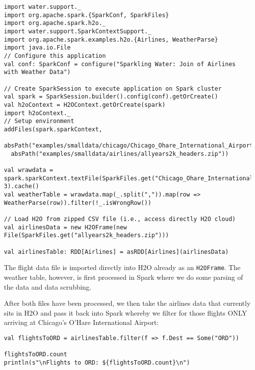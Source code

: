 \begin{lstlisting}[style=Scala]
import water.support._
import org.apache.spark.{SparkConf, SparkFiles}
import org.apache.spark.h2o._
import water.support.SparkContextSupport._
import org.apache.spark.examples.h2o.{Airlines, WeatherParse}
import java.io.File
// Configure this application
val conf: SparkConf = configure("Sparkling Water: Join of Airlines with Weather Data")

// Create SparkSession to execute application on Spark cluster
val spark = SparkSession.builder().config(conf).getOrCreate()
val h2oContext = H2OContext.getOrCreate(spark)
import h2oContext._
// Setup environment
addFiles(spark.sparkContext,
  absPath("examples/smalldata/chicago/Chicago_Ohare_International_Airport.csv"),
  absPath("examples/smalldata/airlines/allyears2k_headers.zip"))

val wrawdata = spark.sparkContext.textFile(SparkFiles.get("Chicago_Ohare_International_Airport.csv"), 3).cache()
val weatherTable = wrawdata.map(_.split(",")).map(row => WeatherParse(row)).filter(!_.isWrongRow())

// Load H2O from zipped CSV file (i.e., access directly H2O cloud)
val airlinesData = new H2OFrame(new File(SparkFiles.get("allyears2k_headers.zip")))

val airlinesTable: RDD[Airlines] = asRDD[Airlines](airlinesData)
\end{lstlisting}

The flight data file is imported directly into H2O already as an \texttt{H2OFrame}. The weather table, however, is first processed in Spark where we do some parsing of the data and data scrubbing.

After both files have been processed, we then take the airlines data that currently sits in H2O and pass it back into Spark whereby we filter for those flights ONLY arriving at Chicago's O'Hare International Airport:
\begin{lstlisting}[style=Scala]
val flightsToORD = airlinesTable.filter(f => f.Dest == Some("ORD"))

flightsToORD.count
println(s"\nFlights to ORD: ${flightsToORD.count}\n")
\end{lstlisting}

